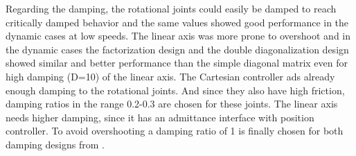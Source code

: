 Regarding the damping, the rotational joints could easily be damped to reach critically damped behavior and the same values showed good performance in the dynamic cases at low speeds. The linear axis was more prone to overshoot and in the dynamic cases the factorization design and the double diagonalization design showed similar and better performance than the simple diagonal matrix even for high damping (D=10) of the linear axis. 
The Cartesian controller ads already enough damping to the rotational joints. And since they also have high friction, damping ratios in the range 0.2-0.3 are chosen for these joints. The linear axis needs higher damping, since it has an admittance interface with position controller. To avoid overshooting a damping ratio of 1 is finally chosen for both damping designs from \cite{alin_damping}.



